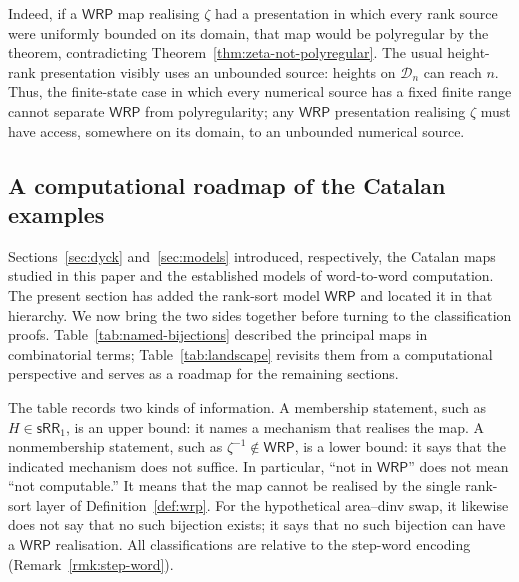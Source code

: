 \documentclass[11pt]{article}
\theoremstyle{definition}
\newcommand{\D}{\mathcal D}
\newcommand{\WRP}{\mathsf{WRP}}
\newcommand{\SWR}{\mathsf{sRR}_1}
\begin{document}
Indeed, if a $\WRP$ map realising $\zeta$ had a presentation in which every
rank source were uniformly bounded on its domain, that map would be
polyregular by the theorem, contradicting
Theorem~\ref{thm:zeta-not-polyregular}.  The usual height-rank presentation
visibly uses an unbounded source: heights on
$\D_n$ can reach $n$.  Thus, the finite-state case in which every numerical
source has a fixed finite range cannot separate $\WRP$ from polyregularity;
any $\WRP$ presentation realising $\zeta$ must have access, somewhere on its
domain, to an unbounded numerical source.


\subsection{A computational roadmap of the Catalan examples}
\label{sec:landscape}

Sections~\ref{sec:dyck} and~\ref{sec:models} introduced, respectively, the
Catalan maps studied in this paper and the established models of word-to-word
computation.  The present section has added the rank-sort model $\WRP$ and
located it in that hierarchy.  We now bring the two sides together before
turning to the classification proofs.  Table~\ref{tab:named-bijections}
described the principal maps in combinatorial terms;
Table~\ref{tab:landscape} revisits them from a computational perspective and
serves as a roadmap for the remaining sections.

The table records two kinds of information.  A membership statement, such as
$H\in\SWR$, is an upper bound: it names a mechanism that realises the map.  A
nonmembership statement, such as $\zeta^{-1}\notin\WRP$, is a lower bound: it
says that the indicated mechanism does not suffice.  In particular, ``not in
$\WRP$'' does not mean ``not computable.''  It means that the map cannot be
realised by the single rank-sort layer of Definition~\ref{def:wrp}.  For the
hypothetical area--dinv swap, it likewise does not say that no such bijection
exists; it says that no such bijection can have a $\WRP$ realisation.  All
classifications are relative to the step-word encoding
(Remark~\ref{rmk:step-word}).
\end{document}
